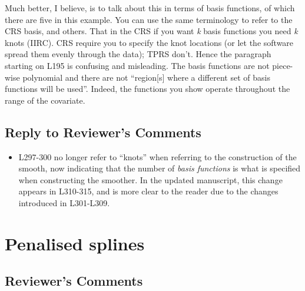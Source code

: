 \documentclass[
]{article}
\providecommand{\tightlist}{%
  \setlength{\itemsep}{0pt}\setlength{\parskip}{0pt}}
\begin{document}
Much better, I believe, is to talk about this in terms of basis functions, of which there are five in this example. You can use the same terminology to refer to the CRS basis, and others. That in the CRS if you want \emph{k} basis functions you need \emph{k} knots (IIRC). CRS require you to specify the knot locations (or let the software spread them evenly through the data); TPRS don't.
Hence the paragraph starting on L195 is confusing and misleading. The basis functions are not piece-wise polynomial and there are not ``region{[}s{]} where a different set of basis functions will be used''. Indeed, the functions you show
operate throughout the range of the covariate.

\hypertarget{section-4}{%
\subsection{\texorpdfstring{\textcolor{reviewersblue} {Reply to Reviewer's Comments}}{}}\label{section-4}}

\begin{itemize}
\tightlist
\item
  L297-300 no longer refer to ``knots'' when referring to the construction of the smooth, now indicating that the number of \emph{basis functions} is what is specified when constructing the smoother. In the updated manuscript, this change appears in L310-315, and is more clear to the reader due to the changes introduced in L301-L309.
\end{itemize}

\hypertarget{penalised-splines}{%
\section{Penalised splines}\label{penalised-splines}}

\hypertarget{reviewers-comments-4}{%
\subsection{Reviewer's Comments}\label{reviewers-comments-4}}
\end{document}
